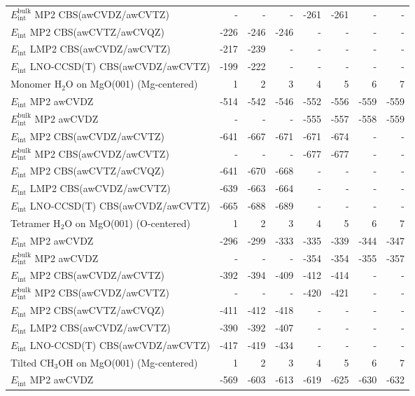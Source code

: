 \begin{longtable}{lrrrrrrr}
$E_\text{int}^\text{bulk}$ MP2 CBS(awCVDZ/awCVTZ) & - & - & - & -261 & -261 & - & - \\
$E_\text{int}$ MP2 CBS(awCVTZ/awCVQZ) & -226 & -246 & -246 & - & - & - & - \\
$E_\text{int}$ LMP2 CBS(awCVDZ/awCVTZ) & -217 & -239 & - & - & - & - & - \\
$E_\text{int}$ LNO-CCSD(T) CBS(awCVDZ/awCVTZ) & -199 & -222 & - & - & - & - & - \\
\toprule
Monomer H$_2$O on MgO(001) (Mg-centered) & 1 & 2 & 3 & 4 & 5 & 6 & 7 \\ 
\midrule
$E_\text{int}$ MP2 awCVDZ & -514 & -542 & -546 & -552 & -556 & -559 & -559 \\
$E_\text{int}^\text{bulk}$ MP2 awCVDZ & - & - & - & -555 & -557 & -558 & -559 \\
$E_\text{int}$ MP2 CBS(awCVDZ/awCVTZ) & -641 & -667 & -671 & -671 & -674 & - & - \\
$E_\text{int}^\text{bulk}$ MP2 CBS(awCVDZ/awCVTZ) & - & - & - & -677 & -677 & - & - \\
$E_\text{int}$ MP2 CBS(awCVTZ/awCVQZ) & -641 & -670 & -668 & - & - & - & - \\
$E_\text{int}$ LMP2 CBS(awCVDZ/awCVTZ) & -639 & -663 & -664 & - & - & - & - \\
$E_\text{int}$ LNO-CCSD(T) CBS(awCVDZ/awCVTZ) & -665 & -688 & -689 & - & - & - & - \\
\toprule
Tetramer H$_2$O on MgO(001) (O-centered) & 1 & 2 & 3 & 4 & 5 & 6 & 7 \\ 
\midrule
$E_\text{int}$ MP2 awCVDZ & -296 & -299 & -333 & -335 & -339 & -344 & -347 \\
$E_\text{int}^\text{bulk}$ MP2 awCVDZ & - & - & - & -354 & -354 & -355 & -357 \\
$E_\text{int}$ MP2 CBS(awCVDZ/awCVTZ) & -392 & -394 & -409 & -412 & -414 & - & - \\
$E_\text{int}^\text{bulk}$ MP2 CBS(awCVDZ/awCVTZ) & - & - & - & -420 & -421 & - & - \\
$E_\text{int}$ MP2 CBS(awCVTZ/awCVQZ) & -411 & -412 & -418 & - & - & - & - \\
$E_\text{int}$ LMP2 CBS(awCVDZ/awCVTZ) & -390 & -392 & -407 & - & - & - & - \\
$E_\text{int}$ LNO-CCSD(T) CBS(awCVDZ/awCVTZ) & -417 & -419 & -434 & - & - & - & - \\
\toprule
Tilted CH$_3$OH on MgO(001) (Mg-centered) & 1 & 2 & 3 & 4 & 5 & 6 & 7 \\ 
\midrule
$E_\text{int}$ MP2 awCVDZ & -569 & -603 & -613 & -619 & -625 & -630 & -632 \\

\end{longtable}
